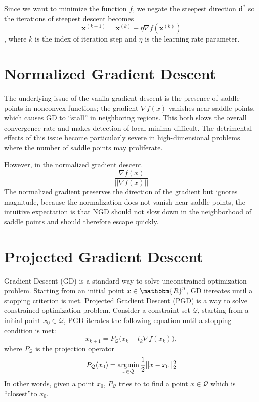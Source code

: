 	Since we want to minimize the function $f$, we negate the steepest direction $\mathbf{d}^{*}$ so the iterations of steepest descent becomes
	$$\mathbf{x}^{(k+1)} = \mathbf{x}^{(k)} - \eta \nabla f(\mathbf{x}^{(k)})$$
	, where $k$ is the index of iteration step and $\eta$ is the learning rate parameter.




\section{Normalized Gradient Descent}

The underlying issue of the vanila gradient descent is the presence of saddle points in nonconvex functions; the gradient $\nabla f(x)$ vanishes near saddle points, which causes GD to ``stall'' in neighboring regions. This both slows the overall convergence rate and makes detection of local minima difficult. The detrimental effects of this issue become particularly severe in high-dimensional problems where the number of saddle points may proliferate.


However, in the normalized gradient descent
$$ \frac{\nabla f(x)}{||\nabla f(x)||}$$
The normalized gradient preserves the direction of the gradient but ignores magnitude, because the normalization does not vanish near saddle points, the intuitive expectation is that NGD should not slow down in the neighborhood of saddle points and should therefore escape quickly. 

\section{Projected Gradient Descent}
Gradient Descent (GD) is a standard way to solve unconstrained optimization problem. Starting from an initial point $x\in \mathbbm{R}^n$, GD itereates until a stopping criterion is met. Projected Gradient Descent (PGD) is a way to solve constrained optimization problem. Consider a constraint set $\mathcal{Q}$, starting from a initial point $x_0 \in \mathcal{Q}$, PGD iterates the following equation until a stopping condition is met:
$$x_{k+1} = P_\mathcal{Q} \Big(x_k - t_k \nabla f(x_k)\Big),$$
where $P_\mathcal{Q}$ is the projection operator
$$P_\mathcal{Q}(x_0) = \operatorname*{\operatorname{argmin}}_{x\in \mathcal{Q}} \frac{1}{2}||x-x_0||^2_2$$
In other words, given a point $x_0$, $P_\mathcal{Q}$ tries to to find a point $x\in \mathcal{Q}$ which is ``closest''to $x_0$.



